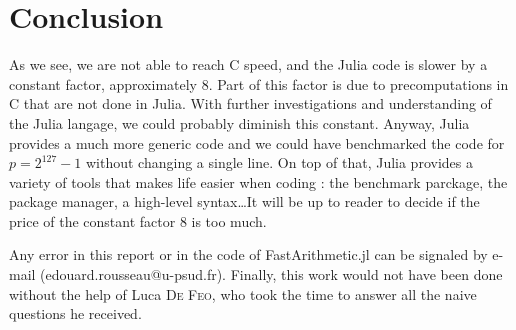 \documentclass[a4paper,11pt]{article}
\theoremstyle{break}
\theoremstyle{definition}
\theoremstyle{remark}
\begin{document}
\section{Conclusion}
As we see, we are not able to reach C speed, and the Julia code is slower by a
constant factor, approximately $8$. Part of this factor is due to
precomputations in C that are not done in Julia. With further investigations and
understanding of the Julia langage, we could probably diminish this constant.
Anyway, Julia provides a much more generic code and we could have benchmarked
the code for $p=2^{127}-1$ without changing a single line. On top of that, Julia
provides a variety of tools that makes life easier when coding : the benchmark
parckage, the package manager, a high-level syntax\dots It will be up to reader
to decide if the price of the constant factor $8$ is too much.

Any error in this report or in the code of FastArithmetic.jl can be signaled by
e-mail (edouard.rousseau@u-psud.fr). Finally, this work would not have been done
without the help of Luca \textsc{De Feo}, who took the time to answer all the
naive questions he received.


\clearpage


\end{document}
